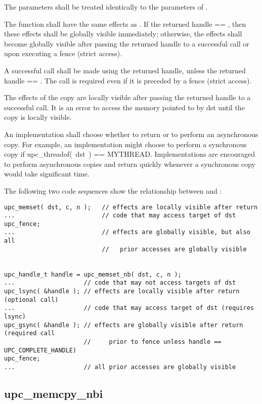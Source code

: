\npf The parameters shall be treated identically to the parameters of
\memset{}.

\np The \function{} function shall have the same effects as \memset{}.
If the returned handle == \complete{}, then these effects shall be globally
visible immediately; otherwise, the effects shall become globally visible after
passing the returned handle to a successful \gsync{} call or upon executing a
fence (strict access).

\np A successful \gsync{} call shall be made using the returned handle,
unless the returned handle == \complete{}.  The call is required even if it is
preceded by a fence (strict access).

\np The effects of the copy are locally visible after passing the
returned handle to a successful \lsync{} call.  It is an error to access the
memory pointed to by dst until the copy is locally visible.

\np An implementation shall choose whether to return \complete{} or to
perform an asynchronous copy.  For example, an implementation might choose to
perform a synchronous copy if upc\_threadof(~dst~) == MYTHREAD.  Implementations
are encouraged to perform asynchronous copies and return quickly whenever a
synchronous copy would take significant time.

\np The following two code sequences show the relationship between
\memset{} and \function{}:

\begin{verbatim}
upc_memset( dst, c, n );   // effects are locally visible after return
...                        // code that may access target of dst
upc_fence;                 
...                        // effects are globally visible, but also all
                           //   prior accesses are globally visible


upc_handle_t handle = upc_memset_nb( dst, c, n );
...                   // code that may not access targets of dst
upc_lsync( &handle ); // effects are locally visible after return (optional call)
...                   // code that may access target of dst (requires lsync)
upc_gsync( &handle ); // effects are globally visible after return (required call
                      //     prior to fence unless handle == UPC_COMPLETE_HANDLE)
upc_fence;
...                   // all prior accesses are globally visible
\end{verbatim}

\newpage
\subsection{upc\_memcpy\_nbi}
\def\function{{\tt upc\_memcpy\_nbi}}

